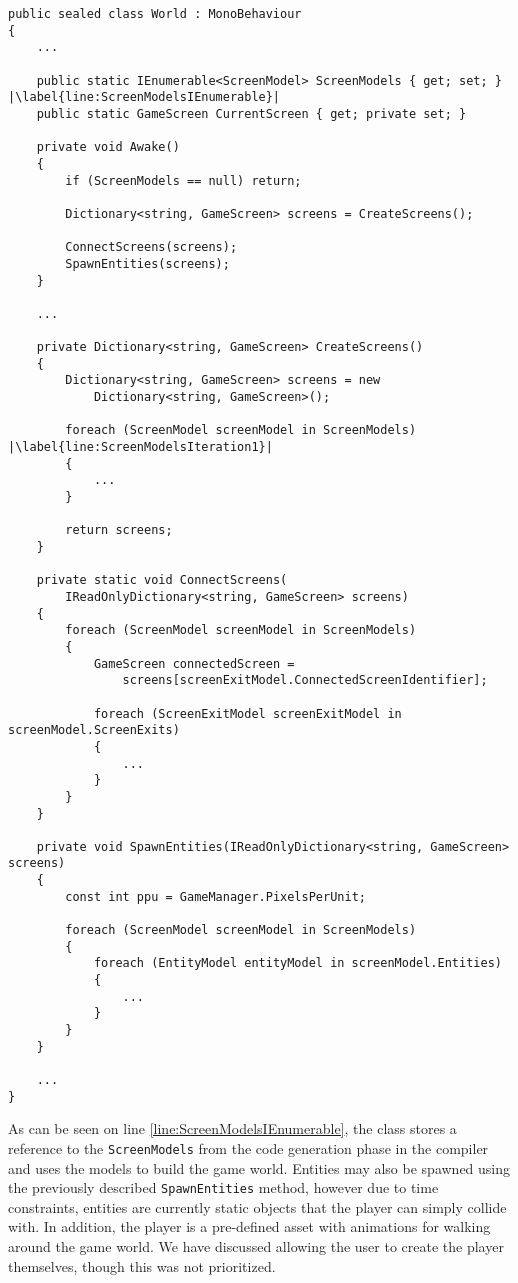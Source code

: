 \begin{lstlisting}[language=CSharp, caption={The \texttt{World} class responsible for generating and connectind screens.}, label={lst:WorldClassUnity},escapechar=|]
public sealed class World : MonoBehaviour
{
	...
    
    public static IEnumerable<ScreenModel> ScreenModels { get; set; } |\label{line:ScreenModelsIEnumerable}|
    public static GameScreen CurrentScreen { get; private set; }
    
    private void Awake()
    {
        if (ScreenModels == null) return;
        
        Dictionary<string, GameScreen> screens = CreateScreens();

        ConnectScreens(screens);
        SpawnEntities(screens);
    }

	...

    private Dictionary<string, GameScreen> CreateScreens()
    {
        Dictionary<string, GameScreen> screens = new 
            Dictionary<string, GameScreen>();

        foreach (ScreenModel screenModel in ScreenModels) |\label{line:ScreenModelsIteration1}|
        {
			...
        }

        return screens;
    }

    private static void ConnectScreens(
        IReadOnlyDictionary<string, GameScreen> screens)
    {
        foreach (ScreenModel screenModel in ScreenModels) 
        {
            GameScreen connectedScreen = 
                screens[screenExitModel.ConnectedScreenIdentifier];

            foreach (ScreenExitModel screenExitModel in screenModel.ScreenExits)
            {
				...
            }
        }
    }

    private void SpawnEntities(IReadOnlyDictionary<string, GameScreen> screens)
    {
        const int ppu = GameManager.PixelsPerUnit;
        
        foreach (ScreenModel screenModel in ScreenModels)
        {
            foreach (EntityModel entityModel in screenModel.Entities)
            {
				...
            }
        }
    }
	
	...
}
\end{lstlisting}

As can be seen on line \ref{line:ScreenModelsIEnumerable}, the class stores a reference to the \texttt{ScreenModels} from the code generation phase in the compiler and uses the models to build the game world. 
Entities may also be spawned using the previously described \texttt{SpawnEntities} method, however due to time constraints, entities are currently static objects that the player can simply collide with. 
In addition, the player is a pre-defined asset with animations for walking around the game world. We have discussed allowing the user to create the player themselves, though this was not prioritized.


